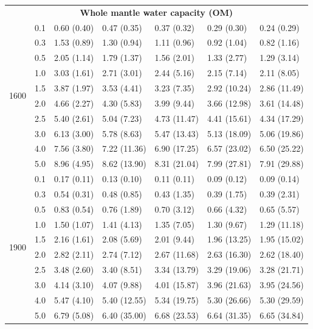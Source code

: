 \documentclass[fleqn,usenatbib]{mnras}
\begin{document}
\begin{table}
\begin{tabular}{@{} c c l l l l l @{}}
\multicolumn{7}{c}{\textbf{Whole mantle water capacity (OM)}} \\
\multirow{10}{*}{1600} & 0.1 & 0.60 (0.40) & 0.47 (0.35) & 0.37 (0.32) & 0.29 (0.30) & 0.24 (0.29) \\
 & 0.3 & 1.53 (0.89) & 1.30 (0.94) & 1.11 (0.96) & 0.92 (1.04) & 0.82 (1.16) \\
 & 0.5 & 2.05 (1.14) & 1.79 (1.37) & 1.56 (2.01) & 1.33 (2.77) & 1.29 (3.14) \\
 & 1.0 & 3.03 (1.61) & 2.71 (3.01) & 2.44 (5.16) & 2.15 (7.14) & 2.11 (8.05) \\
 & 1.5 & 3.87 (1.97) & 3.53 (4.41) & 3.23 (7.35) & 2.92 (10.24) & 2.86 (11.49) \\
 & 2.0 & 4.66 (2.27) & 4.30 (5.83) & 3.99 (9.44) & 3.66 (12.98) & 3.61 (14.48) \\
 & 2.5 & 5.40 (2.61) & 5.04 (7.23) & 4.73 (11.47) & 4.41 (15.61) & 4.34 (17.29) \\
 & 3.0 & 6.13 (3.00) & 5.78 (8.63) & 5.47 (13.43) & 5.13 (18.09) & 5.06 (19.86) \\
 & 4.0 & 7.56 (3.80) & 7.22 (11.36) & 6.90 (17.25) & 6.57 (23.02) & 6.50 (25.22) \\
 & 5.0 & 8.96 (4.95) & 8.62 (13.90) & 8.31 (21.04) & 7.99 (27.81) & 7.91 (29.88) \\
\hline
\multirow{10}{*}{1900} & 0.1 & 0.17 (0.11) & 0.13 (0.10) & 0.11 (0.11) & 0.09 (0.12) & 0.09 (0.14) \\
 & 0.3 & 0.54 (0.31) & 0.48 (0.85) & 0.43 (1.35) & 0.39 (1.75) & 0.39 (2.31) \\
 & 0.5 & 0.83 (0.54) & 0.76 (1.89) & 0.70 (3.12) & 0.66 (4.32) & 0.65 (5.57) \\
 & 1.0 & 1.50 (1.07) & 1.41 (4.13) & 1.35 (7.05) & 1.30 (9.67) & 1.29 (11.18) \\
 & 1.5 & 2.16 (1.61) & 2.08 (5.69) & 2.01 (9.44) & 1.96 (13.25) & 1.95 (15.02) \\
 & 2.0 & 2.82 (2.11) & 2.74 (7.12) & 2.67 (11.68) & 2.63 (16.30) & 2.62 (18.40) \\
 & 2.5 & 3.48 (2.60) & 3.40 (8.51) & 3.34 (13.79) & 3.29 (19.06) & 3.28 (21.71) \\
 & 3.0 & 4.14 (3.10) & 4.07 (9.88) & 4.01 (15.87) & 3.96 (21.63) & 3.95 (24.56) \\
 & 4.0 & 5.47 (4.10) & 5.40 (12.55) & 5.34 (19.75) & 5.30 (26.66) & 5.30 (29.59) \\
 & 5.0 & 6.79 (5.08) & 6.40 (35.00) & 6.68 (23.53) & 6.64 (31.35) & 6.65 (34.84) \\
\hline

\end{tabular}
\end{table}
\end{document}
